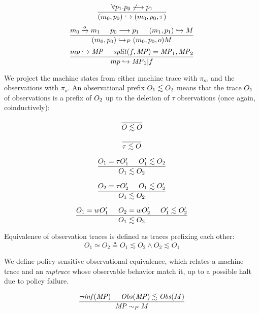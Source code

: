 \documentclass[conference]{IEEEtran}
\begin{document}
    \[\frac{\forall p_1 . p_0 \not \longrightarrow p_1}
           {(m_0,p_0) \hookrightarrow (m_0,p_0,\tau)}\]
    \[\frac{m_0 \xrightarrow{o} m_1 \hspace{.5cm} p_0 \longrightarrow p_1 \hspace{.5cm}
              (m_1,p_1) \hookrightarrow M}
           {(m_0,p_0) \hookrightarrow_P (m_0,p_0,o) M}\]
    \[\frac{mp \hookrightarrow \mathit{MP} \hspace{.5cm} \mathit{split}(f,\mathit{MP}) = \mathit{MP}_1,\mathit{MP}_2}
           {mp \hookrightarrow \mathit{MP}_1 | f}\]
    
    We project the machine states from either machine trace with \(\pi_m\) and the observations with \(\pi_o\).
    An observational prefix \(O_1 \lesssim O_2\) means that the trace \(O_1\) of observations is
    a prefix of \(O_2\) up to the deletion of \(\tau\) observations (once again, coinductively):

    \[\frac{}
           {O \lesssim O}\]

    \[\frac{}
           {\tau \lesssim O}\]

    \[\frac{O_1 = \tau O_1' \hspace{.5cm} O_1' \lesssim O_2}
           {O_1 \lesssim O_2}\]

    \[\frac{O_2 = \tau O_2' \hspace{.5cm} O_1 \lesssim O_2'}
           {O_1 \lesssim O_2}\]

    \[\frac{O_1 = w O_1' \hspace{.5cm} O_2 = w O_2' \hspace{.5cm} O_1' \lesssim O_2'}
           {O_1 \lesssim O_2}\]
    
    Equivalence of observation traces is defined as traces prefixing each other:
    \[O_1 \simeq O_2 \triangleq O_1 \lesssim O_2 \land O_2 \lesssim O_1\]

    We define policy-sensitive observational equivalence, which relates a machine trace and
    an {\it mptrace} whose observable behavior match it, up to a possible halt due to policy failure.

    \[\frac{\neg \mathit{inf}(\mathit{MP}) \hspace{.5cm} \mathit{Obs}(\mathit{MP}) \lesssim \mathit{Obs}(M)}
           {\mathit{MP} \sim_P M}\]
    
\end{document}
